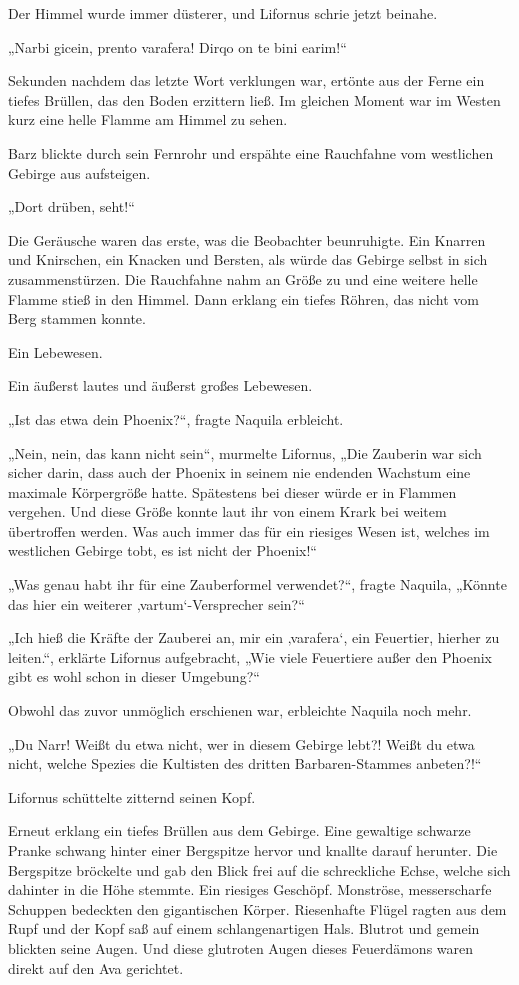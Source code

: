 Der Himmel wurde immer düsterer, und Lifornus schrie jetzt beinahe.

„Narbi gicein, prento varafera! Dirqo on te bini earim!“

Sekunden nachdem das letzte Wort verklungen war, ertönte aus der Ferne ein tiefes Brüllen, das den Boden erzittern ließ. Im gleichen Moment war im Westen kurz eine helle Flamme am Himmel zu sehen.

Barz blickte durch sein Fernrohr und erspähte eine Rauchfahne vom westlichen Gebirge aus aufsteigen.

„Dort drüben, seht!“

Die Geräusche waren das erste, was die Beobachter beunruhigte. Ein Knarren und Knirschen, ein Knacken und Bersten, als würde das Gebirge selbst in sich zusammenstürzen. Die Rauchfahne nahm an Größe zu und eine weitere helle Flamme stieß in den Himmel. Dann erklang ein tiefes Röhren, das nicht vom Berg stammen konnte.

Ein Lebewesen.

Ein äußerst lautes und äußerst großes Lebewesen.

„Ist das etwa dein Phoenix?“, fragte Naquila erbleicht.

„Nein, nein, das kann nicht sein“, murmelte Lifornus, „Die Zauberin war sich sicher darin, dass auch der Phoenix in seinem nie endenden Wachstum eine maximale Körpergröße hatte. Spätestens bei dieser würde er in Flammen vergehen. Und diese Größe konnte laut ihr von einem Krark bei weitem übertroffen werden. Was auch immer das für ein riesiges Wesen ist, welches im westlichen Gebirge tobt, es ist nicht der Phoenix!“

„Was genau habt ihr für eine Zauberformel verwendet?“, fragte Naquila, „Könnte das hier ein weiterer ‚vartum‘-Versprecher sein?“

„Ich hieß die Kräfte der Zauberei an, mir ein ‚varafera‘, ein Feuertier, hierher zu leiten.“, erklärte Lifornus aufgebracht, „Wie viele Feuertiere außer den Phoenix gibt es wohl schon in dieser Umgebung?“

Obwohl das zuvor unmöglich erschienen war, erbleichte Naquila noch mehr.

„Du Narr! Weißt du etwa nicht, wer in diesem Gebirge lebt?! Weißt du etwa nicht, welche Spezies die Kultisten des dritten Barbaren-Stammes anbeten?!“

Lifornus schüttelte zitternd seinen Kopf.

Erneut erklang ein tiefes Brüllen aus dem Gebirge. Eine gewaltige schwarze Pranke schwang hinter einer Bergspitze hervor und knallte darauf herunter. Die Bergspitze bröckelte und gab den Blick frei auf die schreckliche Echse, welche sich dahinter in die Höhe stemmte. Ein riesiges Geschöpf. Monströse, messerscharfe Schuppen bedeckten den gigantischen Körper. Riesenhafte Flügel ragten aus dem Rupf und der Kopf saß auf einem schlangenartigen Hals. Blutrot und gemein blickten seine Augen. Und diese glutroten Augen dieses Feuerdämons waren direkt auf den Ava gerichtet.

